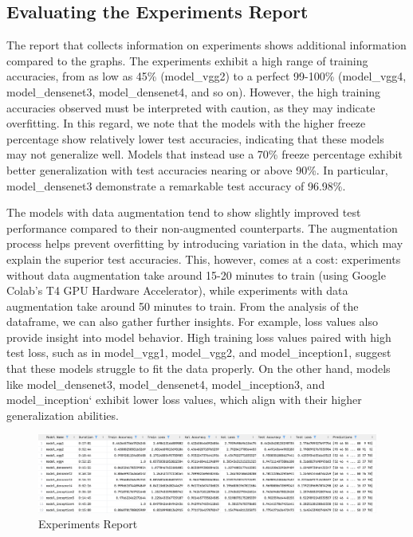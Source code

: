 \subsection{Evaluating the Experiments Report}

The report that collects information on experiments shows additional information compared to the graphs. The experiments
exhibit a high range of training accuracies, from as low as 45\% (model\_vgg2) to a perfect 99-100\%
(model\_vgg4, model\_densenet3, model\_densenet4, and so on). However, the high training accuracies observed must be
interpreted with caution, as they may indicate overfitting. In this regard, we note that the models with the higher
freeze percentage show relatively lower test accuracies, indicating that these models may not generalize well. Models
that instead use a 70\% freeze percentage exhibit better generalization with test accuracies nearing or above 90\%. In
particular, model\_densenet3 demonstrate a remarkable test accuracy of 96.98\%.

\vspace{0.3cm}

The models with data augmentation tend to show slightly improved test performance compared to their non-augmented
counterparts. The augmentation process helps prevent overfitting by introducing variation in the data, which may
explain the superior test accuracies. This, however, comes at a cost: experiments without data augmentation take
around 15-20 minutes to train (using Google Colab's T4 GPU Hardware Accelerator), while experiments with data
augmentation take around 50 minutes to train.
From the analysis of the dataframe, we can also gather further insights. For example, loss values also provide insight
into model behavior. High training loss values paired with high test loss, such as in model\_vgg1, model\_vgg2, and
model\_inception1, suggest that these models struggle to fit the data properly. On the other hand, models like
model\_densenet3, model\_densenet4, model\_inception3, and model\_inception` exhibit lower loss values,
which align with their higher generalization abilities.

\begin{figure}[h!]
    \centering
    \includegraphics[width=\linewidth]{Images/Report}
    \caption{Experiments Report}
\end{figure}

